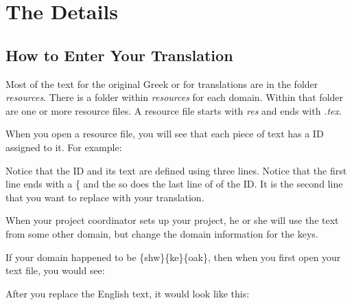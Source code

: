 \documentclass[]{memoir}
\begin{document}
\chapter{The Details}
\section{How to Enter Your Translation}

Most of the text for the original Greek or for translations are in the folder \emph{resources}.  There is a folder within \emph{resources} for each domain.  Within that folder are one or more resource files.  A resource file starts with \emph{res} and ends with \emph{.tex}.

When you open a resource file, you will see that each piece of text has a ID assigned to it.  For example:

\begin{ltDocBlock}[original]
\end{ltDocBlock}

Notice that the ID and its text are defined using three lines. Notice that the first line ends with a \{ and the so does the last line of of the ID.  It is the second line that you want to replace with your translation.

When your project coordinator sets up your project, he or she will use the text from some other domain, but change the domain information for the keys.

If your domain happened to be \{shw\}\{ke\}\{oak\}, then when you first open your text file, you would see:

\begin{ltDocBlock}[before]
    
\end{ltDocBlock}

After you replace the English text, it would look like this:

\begin{ltDocBlock}[after]
    
\end{ltDocBlock}
\end{document}
